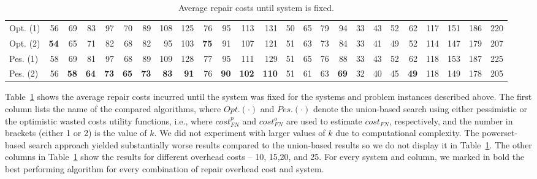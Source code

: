 \documentclass[review]{elsarticle}
\begin{document}
\begin{table}[htb]
{\begin{tabular}{l|rrrr|rrrr|rrrr|rrrr|rrrr|rrrr}
Opt. (1) & 56       & 69       & 83       & 97       & 70       & 89       & 108      & 125      & 76       & 95       & 113       & 131       & 50       & 65       & 79       & 94       & 33       & 43       & 52       & 62       & 117      & 151       & 186       & 220       \\
Opt. (2) & {\bf 54} & 65       & 71       & 82       & 68       & 82       & 95       & 103      & {\bf 75} & 91       & 107       & 121       & 51       & 63       & 73       & 84       & 33       & 41       & 49       & 52       & 114      & 147       & 179       & 207       \\
Pes. (1) & 58       & 69       & 81       & 97       & 68       & 89       & 109      & 128      & 77       & 95       & 111       & 129       & 51       & 65       & 76       & 88       & 33       & 43       & 52       & 62       & 118      & 153       & 187       & 225       \\
Pes. (2) & 56       & {\bf 58} & {\bf 64} & {\bf 73} & {\bf 65} & {\bf 73} & {\bf 83} & {\bf 91} & 76       & {\bf 90} & {\bf 102} & {\bf 110} & 51       & 61       & 63       & {\bf 69} & 32       & 40       & 45       & {\bf 49} & 118      & 149       & 178       & 205      \\ \hline
\end{tabular}
}
\caption{Average repair costs until system is fixed.}
\label{tab:cost-results}
\end{table}



Table~\ref{tab:cost-results} shows the average repair costs incurred until the system was fixed for the systems and problem instances described above.
The first column lists the name of the compared algorithms, where $Opt.(\cdot)$ and $Pes.(\cdot)$ denote the union-based search using either pessimistic or the optimistic wasted costs utility functions, i.e., where
 $cost_{FN}^p$ and $cost_{FN}^o$ are used to estimate $cost_{FN}$, respectively, and the number in brackets (either 1 or 2) is the value of $k$. We did not experiment with larger values of $k$ due to computational complexity. 
The powerset-based search approach yielded substantially worse results compared to the union-based results so we do not display it in Table~\ref{tab:cost-results}.
The other columns in Table~\ref{tab:cost-results} show the results for different overhead costs -- 10, 15,20, and 25. For every system and column, we marked in bold the best performing algorithm for every combination of repair overhead cost and system.
\end{document}
